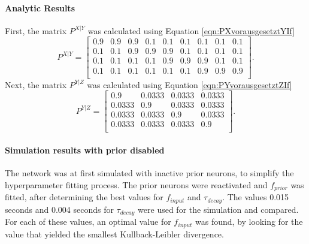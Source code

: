 \paragraph{Analytic Results}

First, the matrix $P^{X|Y}$ was calculated using Equation \ref{eqn:PXvorausgesetztYIf} 
\begin{equation}
\label{eqn:pXvorausgesetztYResult}
P^{X|Y} = \begin{bmatrix}
0.9 & 0.9 & 0.9 & 0.1 & 0.1 & 0.1 & 0.1 & 0.1 & 0.1\\
0.1 & 0.1 & 0.9 & 0.9 & 0.9 & 0.1 & 0.1 & 0.1 & 0.1\\
0.1 & 0.1 & 0.1 & 0.1 & 0.9 & 0.9 & 0.9 & 0.1 & 0.1\\
0.1 & 0.1 & 0.1 & 0.1 & 0.1 & 0.1 & 0.9 & 0.9 & 0.9\\
\end{bmatrix}.
\end{equation}
Next, the matrix $P^{Y|Z}$ was calculated using Equation \ref{eqn:PYvorausgesetztZIf} 
\begin{equation}
\label{eqn:pYvorausgesetztZResult}
P^{Y|Z} = \begin{bmatrix}
0.9 & 0.0333 & 0.0333 & 0.0333\\
0.0333 & 0.9 & 0.0333 & 0.0333\\
0.0333 & 0.0333 & 0.9 & 0.0333\\
0.0333 & 0.0333 & 0.0333 & 0.9\\
\end{bmatrix}.
\end{equation} 

\paragraph{Simulation results with prior disabled}
The network was at first simulated with inactive prior neurons, to simplify the hyperparameter fitting process. The prior neurons were reactivated and $f_{prior}$ was fitted, after determining the best values for $f_{input}$ and $\tau_{decay}$. The values 0.015 seconds and 0.004 seconds for $\tau_{decay}$ were used for the simulation and compared. For each of these values, an optimal value for $f_{input}$ was found, by looking for the value that yielded the smallest Kullback-Leibler divergence.

